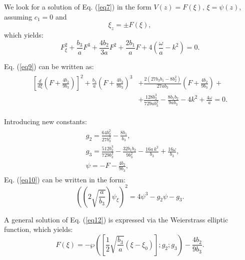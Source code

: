 \documentclass[preprint,12pt]{elsarticle}
\begin{document}
We look for a solution of Eq. (\ref{eq7}) in the form \(V(z)=F(\xi),\,\xi=\psi(z)\), assuming \(c_{1}=0\) and
\begin{equation} \label{eq8}
\xi_{z}=\pm F(\xi),
\end{equation}
which yields:
\begin{equation}\label{eq9}
F_{\xi}^{2}+\frac{ b_{3}}{a}F^{3}+\frac{4 b_{2}}{3 a} F^{2}+\frac{2b_{1}}{a}F+4\left(\frac{\omega}{a} -k^{2}\right)=0.
\end{equation}

Eq. (\ref{eq9}) can be written as:
\begin{equation}\label{eq10}
\begin{aligned}
\begin{split}
\left[\frac{d}{d\xi}\left(F+\frac{4 b_{2}}{9 b_{3}}\right)\right]^{2}+
\frac{b_{3}}{a}\left(F+\frac{4 b_{2}}{9 b_{3}}\right)^{3}&+
\frac{2 (27 b_{3} b_{1}-8 b_{2}^{2}) }{27 a b_{3}}\left(F+\frac{4 b_{2}}{9 b_{3}}\right)+\\
&+\frac{128 b_{2}^{3}}{729 a b_{3}^{2}}-\frac{8 b_{1} b_{2}}{9 a b_{3}}-4 k^{2}+\frac{4 \omega}{a}=0.
\end{split}
\end{aligned}
\end{equation}

Introducing new constants:
\begin{equation}
\begin{aligned}
\begin{split}
&g_{2}=\frac{64 b_{2}^{2}}{27 b_{3}^{2}}-\frac{8 b_{1}}{b_{3}},\\
&g_{3}=\frac{512 b_{2}^{3}}{729 b_{3}^{3}}
-\frac{32 b_{1} b_{2}}{9 b_{3}^{2}}
-\frac{16 a \,k^{2}}{b_{3}}
+\frac{16 \omega}{b_{3}},\\
&\psi=-F-\frac{4 b_{2}}{9 b_{3}},
\end{split}
\end{aligned}
\end{equation}
Eq. (\ref{eq10}) can be written in the form:
\begin{equation}\label{eq12}
\left(\left(2\sqrt{\frac{a}{b_{3}}}\right)\psi_{\xi}\right)^{2}=4 \psi^{3}-g_{2} \psi-g_{3}.
\end{equation}

A general solution of Eq. (\ref{eq12}) is expressed via the Weierstrass elliptic function, which yields:
\begin{equation}\label{eq13}
F(\xi)=-\wp\left(\left[\frac{1}{2}\sqrt{\frac{b_{3}}{a}}\left(\xi-\xi_{0}\right)\right];g_{2};g_{3}\right)-\frac{4 b_{2}}{9 b_{3}}.
\end{equation}
\end{document}
